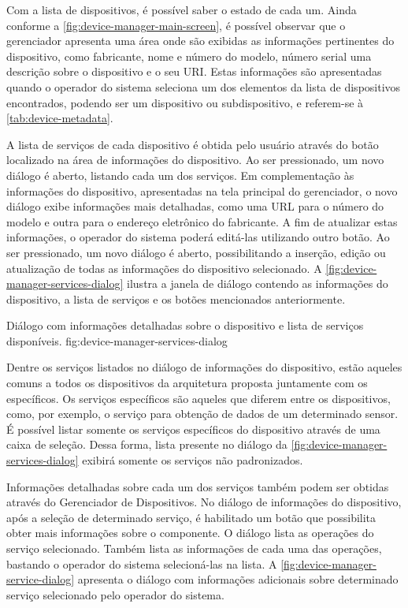 
Com a lista de dispositivos, é possível saber o estado de cada um. Ainda conforme a
\cref{fig:device-manager-main-screen}, é possível observar que o gerenciador apresenta uma área onde
são exibidas as informações pertinentes do dispositivo, como fabricante, nome e número do modelo,
número serial uma descrição sobre o dispositivo e o seu \gls{URI}. Estas informações são
apresentadas quando o operador do sistema seleciona um dos elementos da lista de dispositivos
encontrados, podendo ser um dispositivo ou subdispositivo, e referem-se à \cref{tab:device-metadata}.

A lista de serviços de cada dispositivo é obtida pelo usuário através do botão localizado na área de
informações do dispositivo. Ao ser pressionado, um novo diálogo é aberto, listando cada um dos
serviços. Em complementação às informações do dispositivo, apresentadas na tela principal do
gerenciador, o novo diálogo exibe informações mais detalhadas, como uma \gls{URL} para o número do
modelo e outra para o endereço eletrônico do fabricante. A fim de atualizar estas informações, o
operador do sistema poderá editá-las utilizando outro botão. Ao ser pressionado, um novo diálogo é
aberto, possibilitando a inserção, edição ou atualização de todas as informações do dispositivo
selecionado. A \cref{fig:device-manager-services-dialog} ilustra a janela de diálogo contendo as
informações do dispositivo, a lista de serviços e os botões mencionados anteriormente.

  {Diálogo com informações detalhadas sobre o dispositivo e lista de serviços disponíveis.}
  {fig:device-manager-services-dialog}

Dentre os serviços listados no diálogo de informações do dispositivo, estão aqueles comuns a todos
os dispositivos da arquitetura proposta juntamente com os específicos. Os serviços específicos são
aqueles que diferem entre os dispositivos, como, por exemplo, o serviço para obtenção de dados de um
determinado sensor. É possível listar somente os serviços específicos do dispositivo através de uma
caixa de seleção. Dessa forma, lista presente no diálogo da
\cref{fig:device-manager-services-dialog} exibirá somente os serviços não padronizados.

Informações detalhadas sobre cada um dos serviços também podem ser obtidas através do Gerenciador de
Dispositivos. No diálogo de informações do dispositivo, após a seleção de determinado serviço, é
habilitado um botão que possibilita obter mais informações sobre o componente. O diálogo lista as
operações do serviço selecionado. Também lista as informações de cada uma das operações, bastando o
operador do sistema selecioná-las na lista. A \cref{fig:device-manager-service-dialog} apresenta o
diálogo com informações adicionais sobre determinado serviço selecionado pelo operador do sistema.

